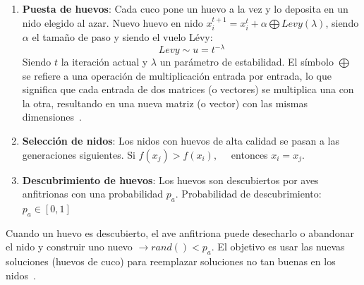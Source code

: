 \begin{enumerate}
    \item \textbf{Puesta de huevos}: Cada cuco pone un huevo a la vez y lo deposita en un nido elegido al azar. Nuevo huevo en nido $x_i^{t+1}= x_i^t + \alpha \bigoplus Levy(\lambda)$, siendo $\alpha$ el tamaño de paso y siendo el vuelo Lévy:
          \begin{equation}
              Levy \sim u=t^{-\lambda}
          \end{equation}
          Siendo $t$ la iteración actual y $\lambda$ un parámetro de estabilidad. El símbolo $\bigoplus$ se refiere a una operación de multiplicación entrada por entrada, lo que significa que cada entrada de dos matrices (o vectores) se multiplica una con la otra, resultando en una nueva matriz (o vector) con las mismas dimensiones~\cite{yang_cuckoo_2010}.
    \item \textbf{Selección de nidos}: Los nidos con huevos de alta calidad se pasan a las generaciones siguientes. Si $f(x_j) > f(x_i), \quad$ entonces $x_i = x_j$.
    \item \textbf{Descubrimiento de huevos}: Los huevos son descubiertos por aves anfitrionas con una probabilidad $p_a$. Probabilidad de descubrimiento: $p_a \in [0, 1]$
\end{enumerate}

Cuando un huevo es descubierto, el ave anfitriona puede desecharlo o abandonar el nido y construir uno nuevo $\rightarrow rand() < p_a$. El objetivo es usar las nuevas soluciones (huevos de cuco) para reemplazar soluciones no tan buenas en los nidos~\cite{yang_cuckoo_2010}.

